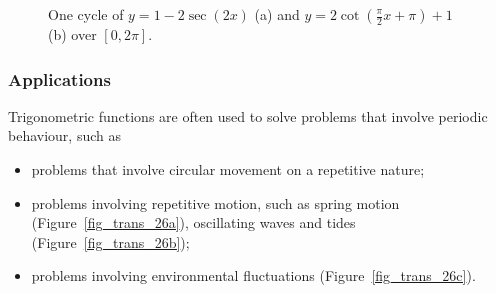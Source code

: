 \begin{example}
\begin{figure}[H]
			\centering
\centerline{
\hspace{0.1cm}
}
	\caption{One cycle of $y=1-2\sec(2x)$ (a) and $y=2\cot(\frac{\pi}{2}x+\pi)+1$ (b) over $[0,2\pi]$.}
\end{figure}


\end{example}


\ifcourse
\subsubsection{Applications}
Trigonometric functions are often used to solve problems that involve periodic behaviour, such as

\begin{itemize}
\item problems that involve circular movement on a repetitive nature;
\item problems involving repetitive motion, such as spring motion (Figure~\ref{fig_trans_26a}), oscillating waves and tides (Figure~\ref{fig_trans_26b});
\item problems involving environmental fluctuations (Figure~\ref{fig_trans_26c}). 
\end{itemize}


